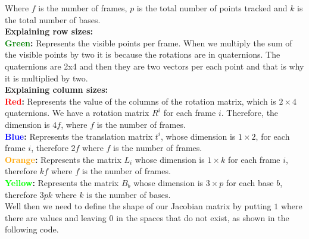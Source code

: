 \noindent Where $f$ is the number of frames, $p$ is the total number of points tracked and $k$ is the total number of bases.\\

\noindent \textbf{Explaining row sizes:}\\
\noindent \textbf{\textcolor{green}{Green}:} Represents the visible points per frame. When we multiply the sum of the visible points by two it is because the rotations are in quaternions. The quaternions are 2x4 and then they are two vectors per each point and that is why it is multiplied by two.\\ 

\noindent \textbf{Explaining column sizes:}\\

\noindent \textbf{\textcolor{red}{Red}:} Represents the value of the columns of the rotation matrix, which is $2\times 4$ quaternions. We have a rotation matrix $R^{i}$ for each frame $i$. Therefore, the dimension is $4f$, where $f$ is the number of frames.\\ 

\noindent \textbf{\textcolor{blue}{Blue}:} Represents the translation matrix $t^{i}$, whose dimension is $1\times 2$, for each frame $i$, therefore $2f$ where $f$ is the number of frames.\\

\noindent \textbf{\textcolor{orange}{Orange}:} Represents the matrix $L_{i}$ whose dimension is $1\times k$ for each frame $i$, therefore $kf$ where $f$ is the number of frames.\\

\noindent \textbf{\textcolor{lime}{Yellow}:} Represents the matrix $B_{b}$ whose dimension is $3\times p$ for each base $b$, therefore $3pk$ where $k$ is the number of bases.\\

\noindent Well then we need to define the shape of our Jacobian matrix by putting $1$ where there are values and leaving $0$ in the spaces that do not exist, as shown in the following code.\\

